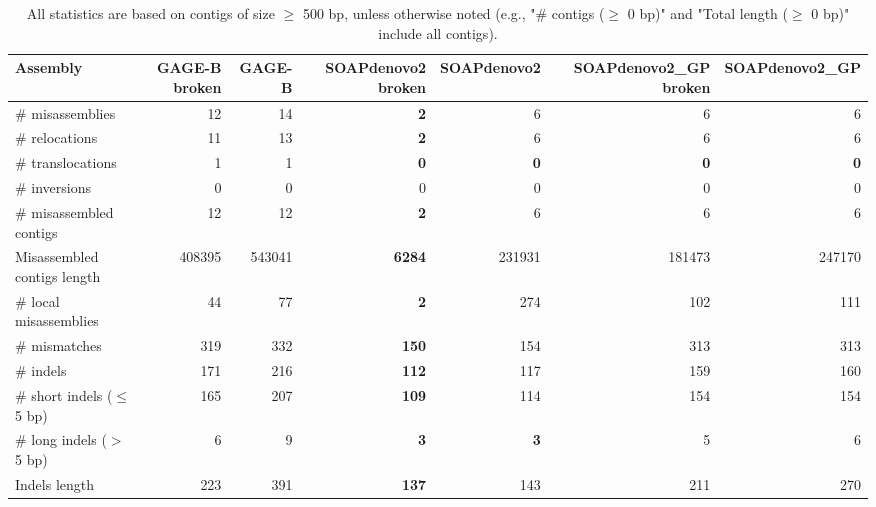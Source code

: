 \documentclass[12pt,a4paper]{article}
\begin{document}
\begin{table}[ht]
\begin{center}
\caption{All statistics are based on contigs of size $\geq$ 500 bp, unless otherwise noted (e.g., "\# contigs ($\geq$ 0 bp)" and "Total length ($\geq$ 0 bp)" include all contigs).}
\begin{tabular}{|l*{6}{|r}|}
\hline
Assembly & GAGE-B broken & GAGE-B & SOAPdenovo2 broken & SOAPdenovo2 & SOAPdenovo2\_GP broken & SOAPdenovo2\_GP \\ \hline
\# misassemblies & 12 & 14 & {\bf 2} & 6 & 6 & 6 \\ \hline
\hspace{5mm}\# relocations & 11 & 13 & {\bf 2} & 6 & 6 & 6 \\ \hline
\hspace{5mm}\# translocations & 1 & 1 & {\bf 0} & {\bf 0} & {\bf 0} & {\bf 0} \\ \hline
\hspace{5mm}\# inversions & 0 & 0 & 0 & 0 & 0 & 0 \\ \hline
\# misassembled contigs & 12 & 12 & {\bf 2} & 6 & 6 & 6 \\ \hline
Misassembled contigs length & 408395 & 543041 & {\bf 6284} & 231931 & 181473 & 247170 \\ \hline
\# local misassemblies & 44 & 77 & {\bf 2} & 274 & 102 & 111 \\ \hline
\# mismatches & 319 & 332 & {\bf 150} & 154 & 313 & 313 \\ \hline
\# indels & 171 & 216 & {\bf 112} & 117 & 159 & 160 \\ \hline
\hspace{5mm}\# short indels ($\leq$ 5 bp) & 165 & 207 & {\bf 109} & 114 & 154 & 154 \\ \hline
\hspace{5mm}\# long indels ($>$ 5 bp) & 6 & 9 & {\bf 3} & {\bf 3} & 5 & 6 \\ \hline
Indels length & 223 & 391 & {\bf 137} & 143 & 211 & 270 \\ \hline
\end{tabular}
\end{center}
\end{table}
\end{document}
